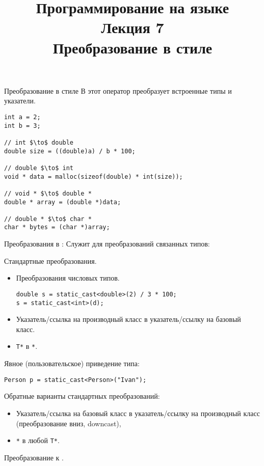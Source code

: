 \documentclass[aspectration=1610,t]{beamer}
\title{{\bf Программирование на языке \langcpp\protect\\Лекция
7\protect\vspace{1em}\\}Преобразование в стиле \langcpp}
\begin{document}
\begin{frame} 
  \titlepage
\end{frame}

\begin{frame}[fragile]{Преобразование в стиле \langc}{}
В \langc этот оператор преобразует встроенные типы и указатели.
\begin{lstlisting}
int a = 2;
int b = 3;
    
// int $\to$ double
double size = ((double)a) / b * 100; 

// double $\to$ int
void * data = malloc(sizeof(double) * int(size));

// void * $\to$ double *
double * array = (double *)data; 

// double * $\to$ char *
char * bytes = (char *)array;
\end{lstlisting}
\end{frame}

\begin{frame}[fragile]{Преобразования в \langcpp: }
    Служит для преобразований связанных типов:
    \begin{itemize}
        \pitem Стандартные преобразования.
        \begin{itemize}
\item Преобразования числовых типов.
\begin{lstlisting}
double s = static_cast<double>(2) / 3 * 100; 
s = static_cast<int>(d);
\end{lstlisting}
\item Указатель/ссылка на производный класс в указатель/ссылку на базовый класс.
\item \texttt{T*} в \texttt{*}.
        \end{itemize}
        \pitem Явное (пользовательское) приведение типа:
\begin{lstlisting}
Person p = static_cast<Person>("Ivan");
\end{lstlisting}
        \pitem Обратные варианты стандартных преобразований:
            \begin{itemize}
                \item Указатель/ссылка на базовый класс в указатель/ссылку на производный класс (преобразование вниз, downcast),
                \item {}\texttt{*} в любой {\tt T*}.                          
            \end{itemize}
        \pitem Преобразование к .
    \end{itemize}
\end{frame}
\end{document}
